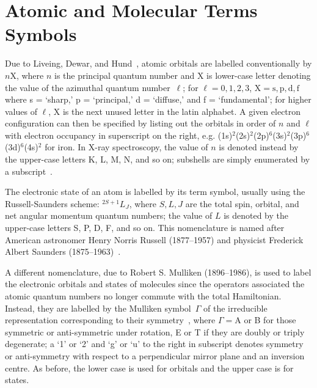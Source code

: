 
\chapter{Atomic and Molecular Terms Symbols}
\label{ap: term-symbols}

Due to Liveing, Dewar, and Hund~\cite{Liveing1915, Hund1927},
atomic orbitals are labelled conventionally
by $n$X, where $n$ is the principal quantum number and
X is lower-case letter denoting the value of the azimuthal quantum number~$\ell$;
for $\ell = 0, 1, 2, 3$, $\mathrm{X} = \mathrm{s}, \mathrm{p}, \mathrm{d}, \mathrm{f}$
where s = `sharp,' p = `principal,' d = `diffuse,' and f = `fundamental';
for higher values of $\ell$, X is the next unused letter in the latin alphabet.
%
A given electron configuration can then be specified by listing out
the orbitals in order of $n$ and $\ell$ with electron occupancy in superscript on the right,
e.g. (1s)$^2$(2s)$^2$(2p)$^6$(3s)$^2$(3p)$^6$(3d)$^6$(4s)$^2$ for iron.
%
In X-ray spectroscopy, the value of $n$ is denoted instead
by the upper-case letters K, L, M, N, and so on;
subshells are simply enumerated by a subscript~\cite{Jenkins1991}.

The electronic state of an atom is labelled by its term symbol,
usually using the Russell-Saunders scheme: $^{2S + 1}L_J$,
where $S, L, J$ are the total spin, orbital, and net angular momentum quantum numbers;
the value of $L$ is denoted by the upper-case letters S, P, D, F, and so on.
This nomenclature is named after American astronomer Henry Norris Russell (1877--1957)
and physicist Frederick Albert Saunders (1875--1963)~\cite{Russell1925}.

A different nomenclature, due to Robert S. Mulliken (1896--1986),
is used to label the electronic orbitals and states of molecules
since the operators associated the atomic quantum numbers no longer commute
with the total Hamiltonian.
Instead, they are labelled by the Mulliken symbol~$\Gamma$ of the irreducible representation
corresponding to their symmetry~\cite{Mulliken1955},
where $\Gamma = \mathrm{A}$ or B for those symmetric or anti-symmetric under rotation,
E or T if they are doubly or triply degenerate;
a `1' or `2' and `g' or `u' to the right in subscript denotes symmetry or anti-symmetry
with respect to a perpendicular mirror plane and an inversion centre.
%
As before, the lower case is used for orbitals and the upper case is for states.

